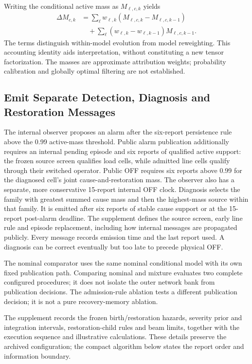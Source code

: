 Writing the conditional active mass as $M_{\ell,c,k}$ yields
\begin{align}
 \Delta M_{c,k}&=\sum_\ell w_{\ell,k}
               (M_{\ell,c,k}-M_{\ell,c,k-1})\nonumber\\
 &\quad+\sum_\ell(w_{\ell,k}-w_{\ell,k-1})M_{\ell,c,k-1}.
 \label{eq:continuous-delta}
\end{align}
The terms distinguish within-model evolution from model reweighting.
This accounting identity aids interpretation, without constituting a new
tensor factorization. The masses are approximate attribution weights;
probability calibration and globally optimal filtering are not established.

\subsection{Emit Separate Detection, Diagnosis and Restoration Messages}

The internal observer proposes an alarm after the six-report persistence
rule above the 0.99 active-mass threshold. Public alarm publication additionally requires an
internal pending episode and six reports of qualified active support:
the frozen source screen qualifies load cells, while admitted line cells
qualify through their switched operator. Public OFF requires six reports
above 0.99 for the diagnosed cell's joint cause-and-restoration mass.
The observer also has a separate, more conservative 15-report internal
OFF clock. Diagnosis selects the family with greatest summed cause mass and then
the highest-mass source within that family. It is emitted after six
reports of stable cause support or at the 15-report post-alarm deadline.
The supplement defines the source screen, early line rule and episode
replacement, including how internal messages are propagated publicly. Every message records emission time and
the last report used. A diagnosis can be correct eventually but too late
to precede physical OFF.

The nominal comparator uses the same nominal conditional model with its
own fixed publication path. Comparing nominal and mixture evaluates two
complete configured procedures; it does not isolate the outer network bank
from publication decisions. The admission-rule ablation tests a different publication
decision; it is not a pure recovery-memory ablation.

The supplement records the frozen birth/restoration hazards, severity
prior and integration intervals, restoration-child rules and beam limits,
together with the execution sequence and illustrative calculations.
These details preserve the archived configuration; the compact algorithm
below states the report order and information boundary.

